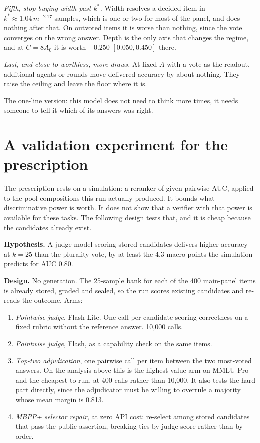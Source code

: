 \documentclass[11pt]{article}
\begin{document}
\emph{Fifth, stop buying width past $k^{*}$.} Width resolves a decided item in
$k^{*} \approx 1.04\,m^{-2.17}$ samples, which is one or two for most of the panel, and does nothing
after that. On outvoted items it is worse than nothing, since the vote converges on the wrong
answer. Depth is the only axis that changes the regime, and at $C = 8A_0$ it is worth $+0.250$
$[0.050, 0.450]$ there.

\emph{Last, and close to worthless, more draws.} At fixed $A$ with a vote as the readout, additional
agents or rounds move delivered accuracy by about nothing. They raise the ceiling and leave the
floor where it is.

The one-line version: this model does not need to think more times, it needs someone to tell it
which of its answers was right.


\appendix

\section{A validation experiment for the prescription}

The prescription rests on a simulation: a reranker of given pairwise AUC, applied to the pool
compositions this run actually produced. It bounds what discriminative power is worth. It does not
show that a verifier with that power is available for these tasks. The following design tests that,
and it is cheap because the candidates already exist.

\textbf{Hypothesis.} A judge model scoring stored candidates delivers higher accuracy at $k=25$ than
the plurality vote, by at least the 4.3 macro points the simulation predicts for AUC 0.80.

\textbf{Design.} No generation. The 25-sample bank for each of the 400 main-panel items is already
stored, graded and sealed, so the run scores existing candidates and re-reads the outcome. Arms:

\begin{enumerate}
\item \emph{Pointwise judge}, Flash-Lite. One call per candidate scoring correctness on a fixed
rubric without the reference answer. 10{,}000 calls.
\item \emph{Pointwise judge}, Flash, as a capability check on the same items.
\item \emph{Top-two adjudication}, one pairwise call per item between the two most-voted answers.
On the analysis above this is the highest-value arm on MMLU-Pro and the cheapest to run, at 400
calls rather than 10{,}000. It also tests the hard part directly, since the adjudicator must be
willing to overrule a majority whose mean margin is 0.813.
\item \emph{MBPP+ selector repair}, at zero API cost: re-select among stored candidates that pass the
public assertion, breaking ties by judge score rather than by order.
\end{enumerate}
\end{document}
